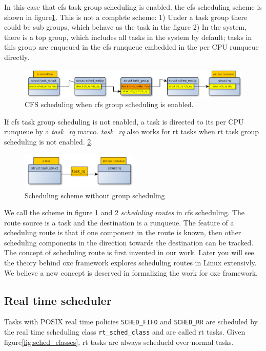 In this case that cfs task group scheduling is enabled. the cfs scheduling 
scheme is shown in figure\ref{fig:cfs_scheme_tg}. 
This is not a complete scheme: 1) Under a task group there could be sub groups, which behave as the task in the figure 2) In the system, there is a top group, 
which includes all tasks in the system by default; tasks in this group are 
enqueued in the cfs runqueue embedded in the per CPU runqueue directly.
\begin{figure}[htbp]
        \centering
        \includegraphics[width=\textwidth]{images/cfs_scheduling_scheme_tg}
        \caption{CFS scheduling when cfs group scheduling is enabled.}
        \label{fig:cfs_scheme_tg}
\end{figure}

If cfs task group scheduling is not enabled, a task is directed to its 
per CPU runqueue by a \emph{task\_rq} marco. \emph{task\_rq} also works 
for rt tasks when rt task group scheduling is not enabled.
\ref{fig:cfs_scheme_no_tg}.
\begin{figure}[htbp]
        \centering
        \includegraphics[height=0.1\textheight,width=0.5\textwidth]{images/scheduling_scheme_no_tg}
        \caption{Scheduling scheme without group scheduling}
        \label{fig:cfs_scheme_no_tg}
\end{figure}

We call the scheme in figure \ref{fig:cfs_scheme_tg} and 
\ref{fig:cfs_scheme_no_tg} \emph{scheduling routes} in cfs scheduling. 
The route source is a task and the destination is a runqueue. 
The feature of a scheduling route is that if one component in the route 
is known, then other scheduling components in the direction towards the 
destination can be tracked.
The concept of scheduling route is first invented in our work. 
Later you will see the theory behind oxc framework explores scheduling routes
in Linux extensivly. We believe a new concept is deserved in formalizing 
the work for oxc framework.

\subsection{Real time scheduler\label{sec:LinuxSched_rt}}
Tasks with POSIX real time policies \texttt{SCHED\_FIFO} and \texttt{SCHED\_RR}
are scheduled by the real time scheduling class \texttt{rt\_sched\_class} and
are called rt tasks. Given figure\ref{fig:sched_classes}, rt tasks are always
schedueld over normal tasks. 

